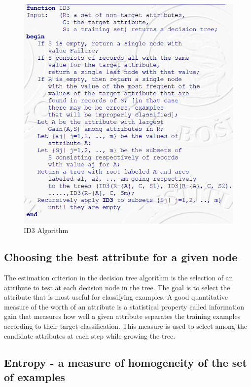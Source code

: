 \documentclass[12pt]{report}
\begin{document}
\begin{figure}[h!]
	\centering
		\includegraphics[scale=1.0]{ID3.png}
	\caption{ID3 Algorithm}
	\label{fig:ID3}
\end{figure}




\subsection{Choosing the best attribute for a given node}
The estimation criterion in the decision tree algorithm is the selection of an attribute to test at each decision node in the tree. The goal is to select the attribute that is most useful for classifying examples. A good quantitative measure of the worth of an attribute is a statistical property called information gain that measures how well a given attribute separates the training examples according to their target classification. This measure is used to select among the candidate attributes at each step while growing the tree. 

\subsection{Entropy - a measure of homogeneity of the set of examples}
\end{document}
